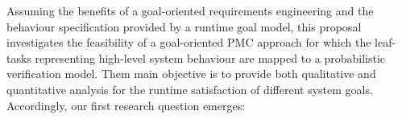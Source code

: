 


Assuming the benefits of a goal-oriented requirements engineering and the behaviour specification provided by a runtime goal model, this proposal investigates the feasibility of a goal-oriented PMC approach for which the leaf-tasks representing high-level system behaviour are mapped to a probabilistic verification model. Them main objective is to provide both qualitative and quantitative analysis for the runtime satisfaction of different system goals. Accordingly, our first research question emerges:



\bigskip


\setlength{\fboxsep}{10pt}
\noindent{}\bigskip



